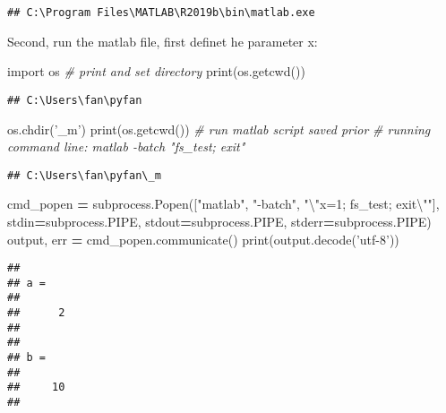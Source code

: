 \documentclass[
]{book}
\newenvironment{Shaded}{\begin{snugshade}}{\end{snugshade}}
\newcommand{\BuiltInTok}[1]{#1}
\newcommand{\CharTok}[1]{\textcolor[rgb]{0.31,0.60,0.02}{#1}}
\newcommand{\CommentTok}[1]{\textcolor[rgb]{0.56,0.35,0.01}{\textit{#1}}}
\newcommand{\ImportTok}[1]{#1}
\newcommand{\NormalTok}[1]{#1}
\newcommand{\OperatorTok}[1]{\textcolor[rgb]{0.81,0.36,0.00}{\textbf{#1}}}
\newcommand{\StringTok}[1]{\textcolor[rgb]{0.31,0.60,0.02}{#1}}
\begin{document}
\begin{verbatim}
## C:\Program Files\MATLAB\R2019b\bin\matlab.exe
\end{verbatim}

Second, run the matlab file, first definet he parameter x:

\begin{Shaded}
\begin{Highlighting}[]
\ImportTok{import}\NormalTok{ os}
\CommentTok{# print and set directory}
\BuiltInTok{print}\NormalTok{(os.getcwd())}
\end{Highlighting}
\end{Shaded}

\begin{verbatim}
## C:\Users\fan\pyfan
\end{verbatim}

\begin{Shaded}
\begin{Highlighting}[]
\NormalTok{os.chdir(}\StringTok{'_m'}\NormalTok{)}
\BuiltInTok{print}\NormalTok{(os.getcwd())}
\CommentTok{# run matlab script saved prior}
\CommentTok{# running command line: matlab -batch "fs_test; exit"}
\end{Highlighting}
\end{Shaded}

\begin{verbatim}
## C:\Users\fan\pyfan\_m
\end{verbatim}

\begin{Shaded}
\begin{Highlighting}[]
\NormalTok{cmd_popen }\OperatorTok{=}\NormalTok{ subprocess.Popen([}\StringTok{"matlab"}\NormalTok{, }\StringTok{"-batch"}\NormalTok{, }\StringTok{"}\CharTok{\textbackslash{}"}\StringTok{x=1; fs_test; exit}\CharTok{\textbackslash{}"}\StringTok{"}\NormalTok{],}
\NormalTok{                             stdin}\OperatorTok{=}\NormalTok{subprocess.PIPE,}
\NormalTok{                             stdout}\OperatorTok{=}\NormalTok{subprocess.PIPE,}
\NormalTok{                             stderr}\OperatorTok{=}\NormalTok{subprocess.PIPE)}
\NormalTok{output, err }\OperatorTok{=}\NormalTok{ cmd_popen.communicate()}
\BuiltInTok{print}\NormalTok{(output.decode(}\StringTok{'utf-8'}\NormalTok{))}
\end{Highlighting}
\end{Shaded}

\begin{verbatim}
## 
## a =
## 
##      2
## 
## 
## b =
## 
##     10
## 
\end{verbatim}
\end{document}
